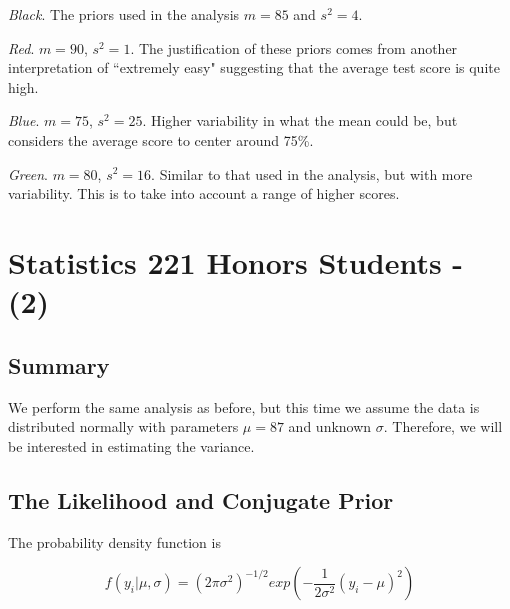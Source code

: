 \documentclass[12pt]{article}
\begin{document}
\noindent \emph{Black}.  The priors used in the analysis $m=85$ and $s^2=4$.

\noindent \emph{Red}. $m=90$, $s^2=1$.  The justification of these priors comes from another interpretation of ``extremely easy" suggesting that the average test score is quite high.

\noindent \emph{Blue}. $m=75$, $s^2=25$.  Higher variability in what the mean could be, but considers the average score to center around 75\%.

\noindent \emph{Green}. $m=80$, $s^2=16$.  Similar to that used in the analysis, but with more variability.  This is to take into account a range of higher scores.

%

\newpage

\section{Statistics 221 Honors Students - (2)}

\subsection{Summary}

\noindent We perform the same analysis as before, but this time we assume the data is distributed normally with parameters $\mu=87$ and unknown $\sigma$.  Therefore, we will be interested in estimating the variance.

\subsection{The Likelihood and Conjugate Prior}

\noindent The probability density function is

\[f(y_i|\mu,\sigma)=(2\pi\sigma^2)^{-1/2}exp\left(-\frac{1}{2\sigma^2}(y_i-\mu)^2\right)\]
\end{document}
